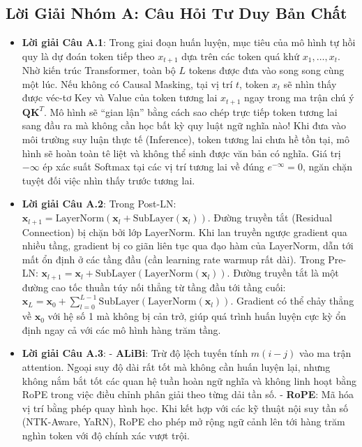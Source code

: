 \subsection{Lời Giải Nhóm A: Câu Hỏi Tư Duy Bản Chất}
\begin{itemize}
  \item \textbf{Lời giải Câu A.1}:
  Trong giai đoạn huấn luyện, mục tiêu của mô hình tự hồi quy là dự đoán token tiếp theo $x_{t+1}$ dựa trên các token quá khứ $x_1, \dots, x_t$. Nhờ kiến trúc Transformer, toàn bộ $L$ tokens được đưa vào song song cùng một lúc.
  Nếu không có Causal Masking, tại vị trí $t$, token $x_t$ sẽ nhìn thấy được véc-tơ Key và Value của token tương lai $x_{t+1}$ ngay trong ma trận chú ý $\mathbf{Q} \mathbf{K}^T$. Mô hình sẽ ``gian lận'' bằng cách sao chép trực tiếp token tương lai sang đầu ra mà không cần học bất kỳ quy luật ngữ nghĩa nào!
  Khi đưa vào môi trường suy luận thực tế (Inference), token tương lai chưa hề tồn tại, mô hình sẽ hoàn toàn tê liệt và không thể sinh được văn bản có nghĩa. Giá trị $-\infty$ ép xác suất Softmax tại các vị trí tương lai về đúng $e^{-\infty} = 0$, ngăn chặn tuyệt đối việc nhìn thấy trước tương lai.

  \item \textbf{Lời giải Câu A.2}:
  Trong Post-LN: $\mathbf{x}_{l+1} = \text{LayerNorm}(\mathbf{x}_l + \text{SubLayer}(\mathbf{x}_l))$. Đường truyền tắt (Residual Connection) bị chặn bởi lớp LayerNorm. Khi lan truyền ngược gradient qua nhiều tầng, gradient bị co giãn liên tục qua đạo hàm của LayerNorm, dẫn tới mất ổn định ở các tầng đầu (cần learning rate warmup rất dài).
  Trong Pre-LN: $\mathbf{x}_{l+1} = \mathbf{x}_l + \text{SubLayer}(\text{LayerNorm}(\mathbf{x}_l))$. Đường truyền tắt là một đường cao tốc thuần túy nối thẳng từ tầng đầu tới tầng cuối: $\mathbf{x}_L = \mathbf{x}_0 + \sum_{l=0}^{L-1} \text{SubLayer}(\text{LayerNorm}(\mathbf{x}_l))$. Gradient có thể chảy thẳng về $\mathbf{x}_0$ với hệ số 1 mà không bị cản trở, giúp quá trình huấn luyện cực kỳ ổn định ngay cả với các mô hình hàng trăm tầng.

  \item \textbf{Lời giải Câu A.3}:
  - \textbf{ALiBi}: Trừ độ lệch tuyến tính $m(i - j)$ vào ma trận attention. Ngoại suy độ dài rất tốt mà không cần huấn luyện lại, nhưng không nắm bắt tốt các quan hệ tuần hoàn ngữ nghĩa và không linh hoạt bằng RoPE trong việc điều chỉnh phân giải theo từng dải tần số.
  - \textbf{RoPE}: Mã hóa vị trí bằng phép quay hình học. Khi kết hợp với các kỹ thuật nội suy tần số (NTK-Aware, YaRN), RoPE cho phép mở rộng ngữ cảnh lên tới hàng trăm nghìn token với độ chính xác vượt trội.


\end{itemize}
